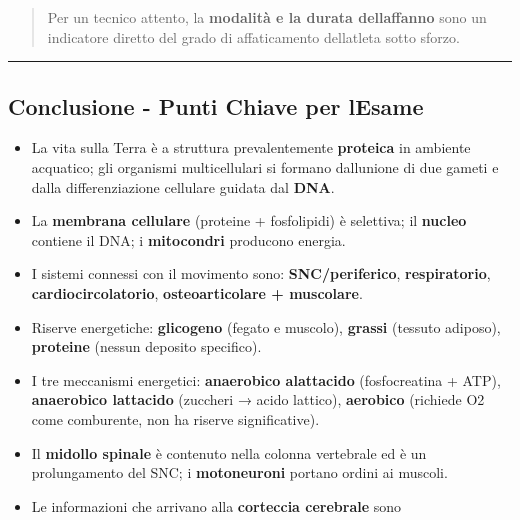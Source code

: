 \documentclass[a4paper,11pt]{article}
\providecommand{\tightlist}{%
  \setlength{\itemsep}{0pt}\setlength{\parskip}{0pt}}
\begin{document}
\begin{quote}
      Per un tecnico attento, la \textbf{modalità e la durata
            dell\textquotesingle affanno} sono un indicatore diretto del grado di
      affaticamento dell\textquotesingle atleta sotto sforzo.
\end{quote}

\begin{center}\rule{0.5\linewidth}{0.5pt}\end{center}

\subsection{Conclusione - Punti Chiave per
      l\textquotesingle Esame}\label{conclusione---punti-chiave-per-lesame-1}

\begin{itemize}
      \tightlist
      \item
            La vita sulla Terra è a struttura prevalentemente \textbf{proteica} in
            ambiente acquatico; gli organismi multicellulari si formano
            dall\textquotesingle unione di due gameti e dalla differenziazione
            cellulare guidata dal \textbf{DNA}.
      \item
            La \textbf{membrana cellulare} (proteine + fosfolipidi) è selettiva;
            il \textbf{nucleo} contiene il DNA; i \textbf{mitocondri} producono
            energia.
      \item
            I sistemi connessi con il movimento sono: \textbf{SNC/periferico},
            \textbf{respiratorio}, \textbf{cardiocircolatorio},
            \textbf{osteoarticolare + muscolare}.
      \item
            Riserve energetiche: \textbf{glicogeno} (fegato e muscolo),
            \textbf{grassi} (tessuto adiposo), \textbf{proteine} (nessun deposito
            specifico).
      \item
            I tre meccanismi energetici: \textbf{anaerobico alattacido}
            (fosfocreatina + ATP), \textbf{anaerobico lattacido} (zuccheri → acido
            lattico), \textbf{aerobico} (richiede O2 come comburente, non ha
            riserve significative).
      \item
            Il \textbf{midollo spinale} è contenuto nella colonna vertebrale ed è
            un prolungamento del SNC; i \textbf{motoneuroni} portano ordini ai
            muscoli.
      \item
            Le informazioni che arrivano alla \textbf{corteccia cerebrale} sono

\end{itemize}
\end{document}
